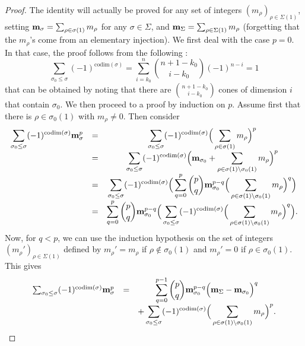 \documentclass[a4paper,10pt]{amsart}
\theoremstyle{plain}{
    \newtheorem{theorem}{Theorem}[section]
    \newtheorem{lemma}[theorem]{Lemma}
    \newtheorem{corollary}[theorem]{Corollary}
    \newtheorem{proposition}[theorem]{Proposition}
    \newtheorem{conjecture}[theorem]{Conjecture}
}
\theoremstyle{definition}{
    \newtheorem{definition}[theorem]{Definition}
    \newtheorem{defn-thm}[theorem]{Definition-Theorem}
    \newtheorem{example}[theorem]{Example}
    \newtheorem{notation}[theorem]{Notation}
}
\theoremstyle{remark}{
    \newtheorem{remark}[theorem]{Remark}
    \newtheorem{problem}[theorem]{Problem}
    \newtheorem{question}[theorem]{Question}
}
\def\um{{\bf m}}
\def\codim{\mathrm{codim}}
\begin{document}
 \begin{proof}
 The identity will actually be proved for any set of integers $(m_\rho)_{\rho\in\Sigma(1)}$, setting 
 $\um_\sigma=\sum_{\rho\in\sigma(1)}m_\rho$ for any $\sigma\in\Sigma$, and $\um_\Sigma=\sum_{\rho\in\Sigma(1)} m_\rho$ (forgetting that the $m_\rho$'s come from an elementary injection). 
  We first deal with the case $p=0$. In that case, the proof follows from the following :
  $$
  \sum_{\sigma_0\leq\sigma} (-1)^{\codim(\sigma)}=\sum_{i=k_0}^n\binom{n+1-k_0}{i-k_0}(-1)^{n-i}=1
  $$
  that can be obtained by noting that there are $\binom{n+1-k_0}{i-k_0}$ cones of dimension $i$ that contain $\sigma_0$. 
 We then proceed to a proof by induction on $p$. Assume first that there is $\rho\in\sigma_0(1)$ with $m_\rho\neq 0$. Then consider
 $$
 \begin{array}{ccc}
 \displaystyle \sum_{\sigma_0\leq\sigma} (-1)^{\codim(\sigma)}\um_\sigma^p & = &\displaystyle\sum_{\sigma_0\leq\sigma} (-1)^{\codim(\sigma)}\Big(\sum_{\rho\in\sigma(1)}m_\rho\Big)^p\\
    & = &\displaystyle\sum_{\sigma_0\leq\sigma} (-1)^{\codim(\sigma)}\Big(\um_{\sigma_0}+\sum_{\rho\in\sigma(1)\setminus\sigma_0(1)}m_\rho\Big)^p\\
     & = &\displaystyle\sum_{\sigma_0\leq\sigma} (-1)^{\codim(\sigma)} \Big(\sum_{q=0}^p \binom{p}{q} \um_{\sigma_0}^{p-q}\Big(\sum_{\rho\in\sigma(1)\setminus\sigma_0(1)}m_\rho\Big)^q \Big)\\
        & = &\displaystyle \sum_{q=0}^p \binom{p}{q}\um_{\sigma_0}^{p-q}\Big(\sum_{\sigma_0\leq\sigma} (-1)^{\codim(\sigma)} \Big(\sum_{\rho\in\sigma(1)\setminus\sigma_0(1)}m_\rho\Big)^q \Big).
 \end{array}
 $$
 Now, for $q<p$, we can use the induction hypothesis on the set of integers $(m_\rho')_{\rho\in\Sigma(1)}$ defined by $m_\rho'=m_\rho$ if $\rho\notin\sigma_0(1)$ and $m_\rho'=0$ if $\rho\in\sigma_0(1)$. This gives
 $$
 \begin{array}{ccc}
 \sum_{\sigma_0\leq\sigma} (-1)^{\codim(\sigma)}\um_\sigma^p & = & \displaystyle \sum_{q=0}^{p-1} \binom{p}{q}\um_{\sigma_0}^{p-q}\Big(\um_\Sigma-\um_{\sigma_0}\Big)^q\\
 & & \displaystyle+\sum_{\sigma_0\leq\sigma} (-1)^{\codim(\sigma)} \Big(\sum_{\rho\in\sigma(1)\setminus\sigma_0(1)}m_\rho\Big)^p .

\end{array}$$
\end{proof}
\end{document}
